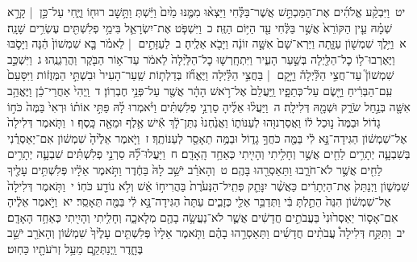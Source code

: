 \documentclass[18pt]{article}
\newcommand{\vart}[1]{\Bfootnote{#1}}	%
\begin{document}
 {\loc יט~}וַיִּבְקַ֨ע אֱלֹהִ֜ים אֶת־הַמַּכְתֵּ֣שׁ אֲשֶׁר־בַּלֶּ֗חִי וַיֵּצְא֨וּ מִמֶּ֤נּוּ מַ֙יִם֙ וַיֵּ֔שְׁתְּ וַתָּ֥שׇׁב רוּח֖וֹ וַיֶּ֑חִי עַל־כֵּ֣ן  |  קָרָ֣א שְׁמָ֗הּ עֵ֤ין הַקּוֹרֵא֙ אֲשֶׁ֣ר בַּלֶּ֔חִי עַ֖ד הַיּ֥וֹם הַזֶּֽה׃ \startlock
 {\loc כ~}וַיִּשְׁפֹּ֧ט אֶת־יִשְׂרָאֵ֛ל בִּימֵ֥י פְלִשְׁתִּ֖ים עֶשְׂרִ֥ים שָׁנָֽה׃ 
\startlock
 {\loc א~}וַיֵּ֥לֶךְ שִׁמְשׁ֖וֹן עַזָּ֑תָה וַיַּרְא־שָׁם֙ אִשָּׁ֣ה זוֹנָ֔ה וַיָּבֹ֖א אֵלֶֽיהָ׃ \startlock
 {\loc ב~}לַעַזָּתִ֣ים  |  לֵאמֹ֗ר בָּ֤א שִׁמְשׁוֹן֙ הֵ֔נָּה וַיָּסֹ֛בּוּ וַיֶּאֶרְבוּ־ל֥וֹ כׇל־הַלַּ֖יְלָה בְּשַׁ֣עַר הָעִ֑יר וַיִּתְחָֽרְשׁ֤וּ כׇל־הַלַּ֙יְלָה֙ לֵאמֹ֔ר עַד־א֥וֹר הַבֹּ֖קֶר וַהֲרַגְנֻֽהוּ׃ \startlock
 {\loc ג~}וַיִּשְׁכַּ֣ב שִׁמְשׁוֹן֮ עַד־חֲצִ֣י הַלַּ֒יְלָה֒ וַיָּ֣קׇם  |  בַּחֲצִ֣י הַלַּ֗יְלָה וַיֶּאֱחֹ֞ז בְּדַלְת֤וֹת שַֽׁעַר־הָעִיר֙ וּבִשְׁתֵּ֣י הַמְּזֻז֔וֹת וַיִּסָּעֵם֙ עִֽם־הַבְּרִ֔יחַ וַיָּ֖שֶׂם עַל־כְּתֵפָ֑יו וַֽיַּעֲלֵם֙ אֶל־רֹ֣אשׁ הָהָ֔ר אֲשֶׁ֖ר עַל־פְּנֵ֥י חֶבְרֽוֹן׃ \startlock
 {\loc ד~}וַֽיְהִי֙ אַחֲרֵי־כֵ֔ן וַיֶּאֱהַ֥ב אִשָּׁ֖ה בְּנַ֣חַל שֹׂרֵ֑ק וּשְׁמָ֖הּ דְּלִילָֽה׃ \startlock
 {\loc ה~}וַיַּעֲל֨וּ אֵלֶ֜יהָ סַרְנֵ֣י פְלִשְׁתִּ֗ים וַיֹּ֨אמְרוּ לָ֜הּ פַּתִּ֣י אוֹת֗וֹ וּרְאִי֙ בַּמֶּה֙ כֹּח֣וֹ גָד֔וֹל וּבַמֶּה֙ נ֣וּכַל ל֔וֹ וַאֲסַרְנוּ֖הוּ לְעַנּוֹת֑וֹ וַאֲנַ֙חְנוּ֙ נִתַּן־לָ֔ךְ אִ֕ישׁ אֶ֥לֶף וּמֵאָ֖ה כָּֽסֶף׃ \startlock
 {\loc ו~}וַתֹּ֤אמֶר דְּלִילָה֙ אֶל־שִׁמְשׁ֔וֹן הַגִּידָה־נָּ֣א לִ֔י בַּמֶּ֖ה כֹּחֲךָ֣ גָד֑וֹל וּבַמֶּ֥ה תֵאָסֵ֖ר לְעַנּוֹתֶֽךָ׃ \startlock
 {\loc ז~}וַיֹּ֤אמֶר אֵלֶ֙יהָ֙ שִׁמְשׁ֔וֹן אִם־יַאַסְרֻ֗נִי בְּשִׁבְעָ֛ה יְתָרִ֥ים לַחִ֖ים אֲשֶׁ֣ר  \edtext{לֹא־חֹרָ֑בוּ}{\vart{=א | מג"ה=לֹא־חֹרָ֖בוּ (כנראה תקלדה) | }}  וְחָלִ֥יתִי וְהָיִ֖יתִי כְּאַחַ֥ד הָֽאָדָֽם׃ \startlock
 {\loc ח~}וַיַּעֲלוּ־לָ֞הּ סַרְנֵ֣י פְלִשְׁתִּ֗ים שִׁבְעָ֛ה יְתָרִ֥ים לַחִ֖ים אֲשֶׁ֣ר לֹא־חֹרָ֑בוּ וַתַּאַסְרֵ֖הוּ בָּהֶֽם׃ \startlock
 {\loc ט~}וְהָאֹרֵ֗ב יֹשֵׁ֥ב לָהּ֙ בַּחֶ֔דֶר וַתֹּ֣אמֶר אֵלָ֔יו פְּלִשְׁתִּ֥ים עָלֶ֖יךָ שִׁמְשׁ֑וֹן וַיְנַתֵּק֙ אֶת־הַיְתָרִ֔ים כַּאֲשֶׁ֨ר יִנָּתֵ֤ק פְּתִֽיל־הַנְּעֹ֙רֶת֙ בַּהֲרִיח֣וֹ אֵ֔שׁ וְלֹ֥א נוֹדַ֖ע כֹּחֽוֹ׃ \startlock
 {\loc י~}וַתֹּ֤אמֶר דְּלִילָה֙ אֶל־שִׁמְשׁ֔וֹן הִנֵּה֙ הֵתַ֣לְתָּ בִּ֔י וַתְּדַבֵּ֥ר אֵלַ֖י כְּזָבִ֑ים עַתָּה֙ הַגִּידָה־נָּ֣א לִ֔י בַּמֶּ֖ה תֵּאָסֵֽר׃ \startlock
 {\loc יא~}וַיֹּ֣אמֶר אֵלֶ֔יהָ אִם־אָס֤וֹר יַאַסְר֙וּנִי֙ בַּעֲבֹתִ֣ים חֲדָשִׁ֔ים אֲשֶׁ֛ר לֹא־נַעֲשָׂ֥ה בָהֶ֖ם מְלָאכָ֑ה וְחָלִ֥יתִי וְהָיִ֖יתִי כְּאַחַ֥ד הָאָדָֽם׃ \startlock
 {\loc יב~}וַתִּקַּ֣ח דְּלִילָה֩ עֲבֹתִ֨ים חֲדָשִׁ֜ים וַתַּאַסְרֵ֣הוּ בָהֶ֗ם וַתֹּ֤אמֶר אֵלָיו֙ פְּלִשְׁתִּ֤ים עָלֶ֙יךָ֙ שִׁמְשׁ֔וֹן וְהָאֹרֵ֖ב יֹשֵׁ֣ב בֶּחָ֑דֶר וַֽיְנַתְּקֵ֛ם מֵעַ֥ל זְרֹעֹתָ֖יו כַּחֽוּט׃ \startlock
\end{document}
